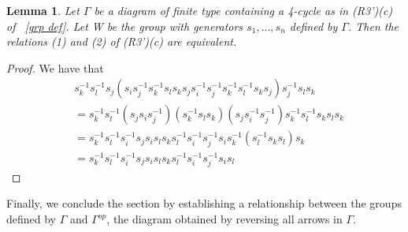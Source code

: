 \documentclass[11pt]{amsart}
\newtheorem{lem}[thm]{Lemma}
\theoremstyle{definition}
\begin{document}
\begin{lem} 
Let $\Gamma$ be a diagram of finite type containing a 4-cycle as in (R3')(c) of ~\ref{grp def}. Let W be the group with generators $s_{1}, \dots, s_{n}$ defined by $\Gamma$. Then the relations (1) and (2) of (R3')(c) are equivalent.
\end{lem}

\begin{proof}
We have that
\begin{align*}
& s_{k}^{-1}s_{l}^{-1}s_{j}(s_{i}s_{j}^{-1}s_{k}^{-1}s_{l}s_{k}s_{j}s_{i}^{-1}s_{j}^{-1}s_{k}^{-1}s_{l}^{-1}s_{k}s_{j})s_{j}^{-1}s_{l}s_{k} \\
&= s_{k}^{-1}s_{l}^{-1}(s_{j}s_{i}s_{j}^{-1})(s_{k}^{-1}s_{l}s_{k})(s_{j}s_{i}^{-1}s_{j}^{-1})s_{k}^{-1}s_{l}^{-1}s_{k}s_{l}s_{k} \\
&= s_{k}^{-1}s_{l}^{-1}s_{i}^{-1}s_{j}s_{i}s_{l}s_{k}s_{l}^{-1}s_{i}^{-1}s_{j}^{-1}s_{i}s_{k}^{-1}(s_{l}^{-1}s_{k}s_{l})s_{k} \\
&= s_{k}^{-1}s_{l}^{-1}s_{i}^{-1}s_{j}s_{i}s_{l}s_{k}s_{l}^{-1}s_{i}^{-1}s_{j}^{-1}s_{i}s_{l}
\end{align*}
\end{proof}

Finally, we conclude the section by establishing a relationship between the groups defined by $\Gamma$ and $\Gamma^{op}$, the diagram obtained by reversing all arrows in $\Gamma$.
\end{document}
